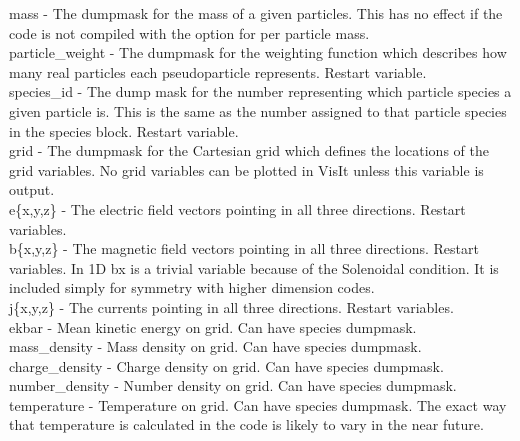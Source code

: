 {\emphtext mass} - The dumpmask for the mass of a given particles. This
has no effect if the code is not compiled with the option for per
particle mass.\\

{\emphtext particle\_weight} - The dumpmask for the weighting function which
describes how many real particles each pseudoparticle represents. Restart
variable.\\

{\emphtext species\_id} - The dump mask for the number representing which
particle species a given particle is. This is the same as the number assigned
to that particle species in the species block. Restart variable.\\

{\emphtext grid} - The dumpmask for the Cartesian grid which defines the
locations of the grid variables. No grid variables can be plotted in VisIt
unless this variable is output.\\

{\emphtext e\{x,y,z\}} - The electric field vectors pointing in all three
directions. Restart variables.\\

{\emphtext b\{x,y,z\}} - The magnetic field vectors pointing in all three
directions. Restart variables. In 1D bx is a trivial variable because of the
Solenoidal condition. It is included simply for symmetry with higher dimension
codes.\\

{\emphtext j\{x,y,z\}} - The currents pointing in all three directions. Restart
variables.\\

{\emphtext ekbar} - Mean kinetic energy on grid. Can have species dumpmask.\\

{\emphtext mass\_density} - Mass density on grid. Can have species dumpmask.\\

{\emphtext charge\_density} - Charge density on grid. Can have species
dumpmask.\\

{\emphtext number\_density} - Number density on grid. Can have species
dumpmask.\\

{\emphtext temperature} - Temperature on grid. Can have species dumpmask. The
exact way that temperature is calculated in the code is likely to vary in the
near future.\\

